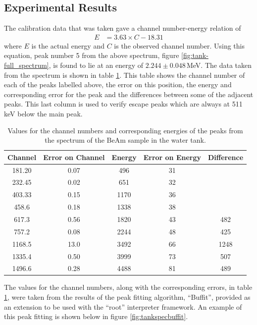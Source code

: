 \subsection{Experimental Results} %
\label{sub:experimental_results}
The calibration data that was taken gave a channel number-energy relation of
\begin{align}
	E &= 3.63\times C - 18.31
\end{align}
where $E$ is the actual energy and $C$ is the observed channel number. Using this equation, peak number 5 from the above spectrum, figure \ref{fig:tank-full_spectrum}, is found to lie at an energy of $2.244\pm0.048$\,MeV. The data taken from the spectrum is shown in table \ref{tab:tankdata}. This table shows the channel number of each of the peaks labelled above, the error on this position, the energy and corresponding error for the peak and the differences between some of the adjacent peaks. This last column is used to verify escape peaks which are always at 511\,keV below the main peak.
\begin{table}[ht]
	\centering
	\begin{tabular}{c|c|c|c|c}
		Channel \textnumero & Error on Channel \textnumero & Energy & Error on Energy & Difference \\
		\hline\hline
		181.20 & 0.07 & 496 & 31 & \\
		232.45 & 0.02 & 651 & 32 &  \\
		403.33 & 0.15 & 1170 & 36 &  \\
		458.6 & 0.18 & 1338 & 38 &  \\
		617.3 & 0.56 & 1820 & 43 & 482 \\
		757.2 & 0.08 & 2244 & 48 & 425 \\
		1168.5 & 13.0 & 3492 & 66 & 1248 \\
		1335.4 & 0.50 & 3999 & 73 & 507 \\
		1496.6 & 0.28 & 4488 & 81 & 489
	\end{tabular}
	\caption{Values for the channel numbers and corresponding energies of the peaks from the spectrum of the BeAm sample in the water tank.\label{tab:tankdata}}
\end{table}

The values for the channel numbers, along with the corresponding errors, in table \ref{tab:tankdata}, were taken from the results of the peak fitting algorithm, ``Buffit'', provided as an extension to be used with the ``root'' interpreter framework. An example of this peak fitting is shown below in figure \ref{fig:tankspecbuffit}.

